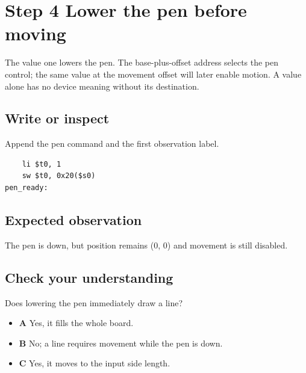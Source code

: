 \section{Step 4 Lower the pen before
  moving}\label{006-marsbot-square-s04-step-4-lower-the-pen-before-moving}

The value one lowers the pen. The base-plus-offset address selects the
pen control; the same value at the movement offset will later enable
motion. A value alone has no device meaning without its destination.

\subsection{Write or
  inspect}\label{006-marsbot-square-s04-write-or-inspect}

Append the pen command and the first observation label.

\begin{verbatim}
    li $t0, 1
    sw $t0, 0x20($s0)
pen_ready:
\end{verbatim}

\subsection{Expected
  observation}\label{006-marsbot-square-s04-expected-observation}

The pen is down, but position remains (0, 0) and movement is still
disabled.

\subsection{Check your
  understanding}\label{006-marsbot-square-s04-check-your-understanding}

Does lowering the pen immediately draw a line?

\begin{itemize}
  \tightlist
  \item
        \textbf{A} Yes, it fills the whole board.
  \item
        \textbf{B} No; a line requires movement while the pen is down.
  \item
        \textbf{C} Yes, it moves to the input side length.
\end{itemize}
